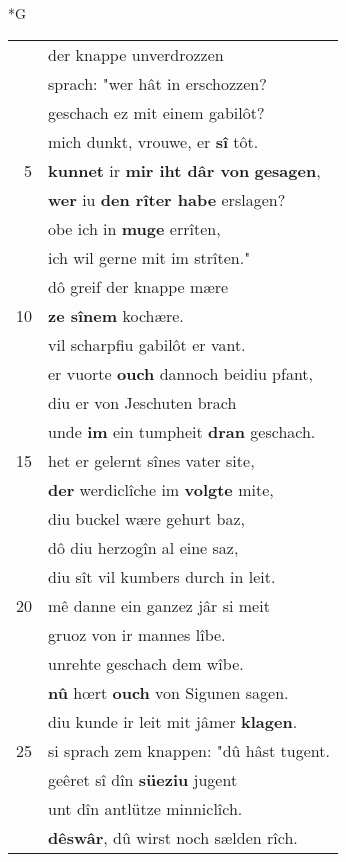 \documentclass[8pt,a4paper,notitlepage]{article}
\begin{document}
\newpage
\begin{table}[ht]
\begin{minipage}[t]{0.5\linewidth}
\small
\begin{center}*G
\end{center}
\begin{tabular}{rl}
 & der knappe unverdrozzen\\ 
 & sprach: "wer hât in erschozzen?\\ 
 & geschach ez mit einem gabilôt?\\ 
 & mich dunkt, vrouwe, er \textbf{sî} tôt.\\ 
5 & \textbf{kunnet} ir \textbf{mir iht dâr von} \textbf{gesagen},\\ 
 & \textbf{wer} iu \textbf{den rîter habe} erslagen?\\ 
 & obe ich in \textbf{muge} errîten,\\ 
 & ich wil gerne mit im strîten."\\ 
 & dô greif der knappe mære\\ 
10 & \textbf{ze sînem} kochære.\\ 
 & vil scharpfiu gabilôt er vant.\\ 
 & er vuorte \textbf{ouch} dannoch beidiu pfant,\\ 
 & diu er von Jeschuten brach\\ 
 & unde \textbf{im} ein tumpheit \textbf{dran} geschach.\\ 
15 & het er gelernt sînes vater site,\\ 
 & \textbf{der} werdiclîche im \textbf{volgte} mite,\\ 
 & diu buckel wære gehurt baz,\\ 
 & dô diu herzogîn al eine saz,\\ 
 & diu sît vil kumbers durch in leit.\\ 
20 & mê danne ein ganzez jâr si meit\\ 
 & gruoz von ir mannes lîbe.\\ 
 & unrehte geschach dem wîbe.\\ 
 & \textbf{nû} hœrt \textbf{ouch} von Sigunen sagen.\\ 
 & diu kunde ir leit mit jâmer \textbf{klagen}.\\ 
25 & si sprach zem knappen: "dû hâst tugent.\\ 
 & geêret sî dîn \textbf{süeziu} jugent\\ 
 & unt dîn antlütze minniclîch.\\ 
 & \textbf{dêswâr}, dû wirst noch sælden rîch.\\ 

\end{tabular}
\end{minipage}
\end{table}
\end{document}

